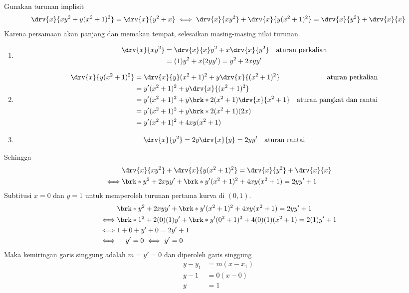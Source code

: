 \begin{enumerate}[leftmargin=*, label={\arabic*}.]
\begin{enumerate}[label={\alph*}.]
    Gunakan turunan implisit
    \begin{align*}
        \drv{x}{xy^{2}+y(x^{2}+1)^{2}} = \drv{x}{y^{2}+x} \iff 
        \drv{x}{xy^{2}} + \drv{x}{y(x^{2}+1)^{2}} = \drv{x}{y^{2}} + \drv{x}{x}
    \end{align*}
    Karena persamaan akan panjang dan memakan tempat, selesaikan masing-masing nilai 
    turunan.
    \begin{enumerate}[label={\arabic*})]
        \item 
        \begin{align*}
            \drv{x}{xy^{2}} 
            &= \drv{x}{x}y^{2}+x\drv{x}{y^{2}}
            &\text{aturan perkalian}\\
            &= (1)y^{2} + x(2yy') = y^{2} + 2xyy'
        \end{align*}
        \item 
        \begin{align*}
            \drv{x}{y(x^{2}+1)^{2}} 
            &= \drv{x}{y}(x^{2}+1)^{2}+y\drv{x}{(x^{2}+1)^{2}}
            &\text{aturan perkalian}\\
            &= y'(x^{2}+1)^{2} + y\drv{x}{(x^{2}+1)^{2}}\\
            &=y'(x^{2}+1)^{2} + y\brk*{2(x^{2}+1)\drv{x}{x^{2}+1}}
            &\text{aturan pangkat dan rantai}\\
            &=y'(x^{2}+1)^{2} + y\brk*{2(x^{2}+1)(2x)}\\
            &=y'(x^{2}+1)^{2} + 4xy(x^{2}+1)
        \end{align*}
        \item 
        \[
            \drv{x}{y^{2}} = 2y\drv{x}{y} = 2yy' \quad \text{aturan rantai}
        \]
    \end{enumerate}
    Sehingga 
    \begin{align*}
        &\drv{x}{xy^{2}} + \drv{x}{y(x^{2}+1)^{2}} = \drv{x}{y^{2}} + \drv{x}{x} \\
        \iff &\brk*{y^{2} + 2xyy'} + \brk*{y'(x^{2}+1)^{2} 
        + 4xy(x^{2}+1)}= 2yy' + 1\\
    \end{align*}
    Subtitusi $x = 0$ dan $y=1$ untuk memperoleh turunan pertama kurva di $(0,1)$.
    \begin{align*}
        &\brk*{y^{2} + 2xyy'} + \brk*{y'(x^{2}+1)^{2} 
        + 4xy(x^{2}+1)}= 2yy' + 1\\
        \iff &\brk*{1^{2} + 2(0)(1)y'} + \brk*{y'(0^{2}+1)^{2} 
        + 4(0)(1)(x^{2}+1)}= 2(1)
        y' + 1\\
        \iff &1+0+y'+0 = 2y'+1\\
        \iff &-y' = 0 \iff y' = 0
    \end{align*}
    Maka kemiringan garis singgung adalah $m = y' = 0$ dan diperoleh garis singgung
    \begin{align*}
        y-y_1 &= m(x-x_1)\\
        y-1 &= 0(x-0)\\
        y &= 1
    \end{align*}


\end{enumerate}
\end{enumerate}
